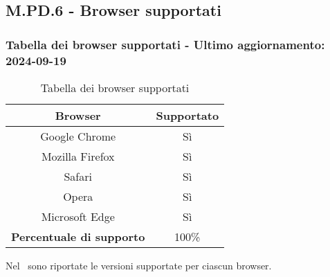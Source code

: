 \subsection{M.PD.6 - Browser supportati}

\subsubsection*{Tabella dei browser supportati - Ultimo aggiornamento: 2024-09-19}

\begin{table}[H]
  \centering
  \begin{tabular}{|c|c|}
      \hline
      \textbf{Browser} & \textbf{Supportato} \\
      \hline
      Google Chrome & Sì \\
      \hline
      Mozilla Firefox & Sì \\
      \hline
      Safari & Sì \\
      \hline
      Opera & Sì \\
      \hline
      Microsoft Edge & Sì \\
      \hline
      \textbf{Percentuale di supporto} & 100\% \\
      \hline 
  \end{tabular}
  \caption{Tabella dei browser supportati}
\end{table}

\par Nel \MU\ sono riportate le versioni supportate per ciascun browser.